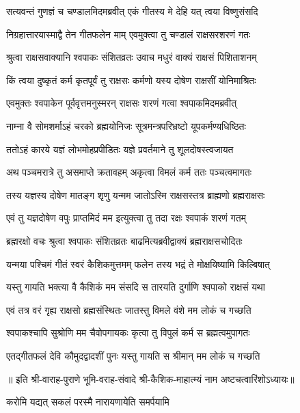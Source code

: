 \twolineshloka
{सत्यवन्तं गुणज्ञं च चण्डालमिदमब्रवीत्}
{एकं गीतस्य मे देहि यत् त्वया विष्णुसंसदि}%

\twolineshloka
{निग्रहात्तारयास्माद्वै तेन गीतफलेन माम्}
{एवमुक्त्वा तु चण्डालं राक्षसरशरणं गतः}%

\twolineshloka
{श्रुत्वा राक्षसवाक्यानि श्वपाकः संशितव्रतः}
{उवाच मधुरं वाक्यं राक्षसं पिशिताशनम्}%

\twolineshloka
{किं त्वया दुष्कृतं कर्म कृतपूर्वं तु राक्षसः}
{कर्मणो यस्य दोषेण राक्षसीं योनिमाश्रितः}%

\twolineshloka
{एवमुक्तः श्वपाकेन पूर्ववृत्तमनुस्मरन्}
{राक्षसः शरणं गत्वा श्वपाकमिदमब्रवीत्}%

\twolineshloka
{नाम्ना वै सोमशर्माऽहं चरको ब्रह्मयोनिजः}
{सूत्रमन्त्रपरिभ्रष्टो यूपकर्मण्यधिष्ठितः}%

\twolineshloka
{ततोऽहं कारये यज्ञं लोभमोहप्रपीडितः}
{यज्ञे प्रवर्तमाने तु शूलदोषस्त्वजायत}%

\twolineshloka
{अथ पञ्चमरात्रे तु असमाप्ते क्रतावहम्}
{अकृत्वा विमलं कर्म ततः पञ्चत्वमागतः}%

\twolineshloka
{तस्य यज्ञस्य दोषेण मातङ्ग शृणु यन्मम}
{जातोऽस्मि राक्षसस्तत्र ब्राह्मणो ब्रह्मराक्षसः}%

\twolineshloka
{एवं तु यज्ञदोषेण वपुः प्राप्तमिदं मम}
{इत्युक्त्वा तु तदा रक्षः श्वपाकं शरणं गतम्}%

\twolineshloka
{ब्रह्मरक्षो वचः श्रुत्वा श्वपाकः संशितव्रतः}
{बाढमित्यब्रवीद्वाक्यं ब्रह्मराक्षसचोदितः}%

\twolineshloka
{यन्मया पश्चिमं गीतं स्वरं कैशिकमुत्तमम्}
{फलेन तस्य भद्रं ते मोक्षयिष्यामि किल्बिषात्}%


\twolineshloka
{यस्तु गायति भक्त्या वै कैशिकं मम संसदि}
{स तारयति दुर्गाणि श्वपाको राक्षसं यथा}%

\twolineshloka
{एवं तत्र वरं गृह्य राक्षसो ब्रह्मसंस्थितः}
{जातस्तु विमले वंशे मम लोकं च गच्छति}%

\twolineshloka
{श्वपाकश्चापि सुश्रोणि मम चैवोपगायकः}
{कृत्वा तु विपुलं कर्म स ब्रह्मत्वमुपागतः}%

\twolineshloka
{एतद्गीतफलं देवि कौमुदद्वादशीं पुनः}
{यस्तु गायति स श्रीमान् मम लोकं च गच्छति}%

॥ इति श्री-वाराह-पुराणे भूमि-वराह-संवादे श्री-कैशिक-माहात्म्यं नाम अष्टचत्वारिंशोऽध्यायः॥

{करोमि यद्यत् सकलं परस्मै नारायणायेति समर्पयामि}

